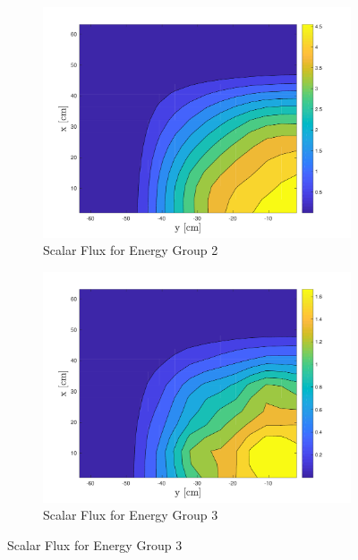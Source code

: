 \begin{figure}[!htbp]\ContinuedFloat
\centering
\begin{subfigure}[b]{0.75\textwidth}
        \includegraphics[width=\textwidth]{Figures/HigherDimEigen/AlphaScalarFluxRQ_g=2}
        \caption{Scalar Flux for Energy Group 2}
   \label{fig:2DScalarFluxAlpha2} 
\end{subfigure}

\begin{subfigure}[b]{0.75\textwidth}
        \includegraphics[width=\textwidth]{Figures/HigherDimEigen/AlphaScalarFluxRQ_g=3}
        \caption{Scalar Flux for Energy Group 3}
   \label{fig:2DScalarFluxAlpha3} 
\end{subfigure}
\end{figure}
